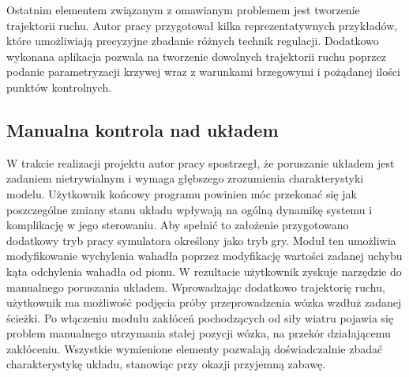 \documentclass[12pt, oneside]{report}
\theoremstyle{definition}
\begin{document}
Ostatnim elementem związanym z omawianym problemem jest tworzenie trajektorii ruchu. Autor pracy przygotował kilka reprezentatywnych przykładów, które umożliwiają precyzyjne zbadanie różnych technik regulacji. Dodatkowo wykonana aplikacja pozwala na tworzenie dowolnych trajektorii ruchu poprzez podanie parametryzacji krzywej wraz z warunkami brzegowymi i pożądanej ilości punktów kontrolnych.

\subsection{Manualna kontrola nad układem}
W trakcie realizacji projektu autor pracy spostrzegł, że poruszanie układem jest zadaniem nietrywialnym i wymaga głębszego zrozumienia charakterystyki modelu. Użytkownik końcowy programu powinien móc przekonać się jak poszczególne zmiany stanu układu wpływają na ogólną dynamikę systemu i komplikację w jego sterowaniu. Aby spełnić to założenie przygotowano dodatkowy tryb pracy symulatora określony jako tryb gry. Moduł ten umożliwia modyfikowanie wychylenia wahadła poprzez modyfikację wartości zadanej uchybu kąta odchylenia wahadła od pionu. W rezultacie użytkownik zyskuje narzędzie do manualnego poruszania układem. Wprowadzając dodatkowo trajektorię ruchu, użytkownik ma możliwość podjęcia próby przeprowadzenia wózka wzdłuż zadanej ścieżki. Po włączeniu modułu zakłóceń pochodzących od siły wiatru pojawia się problem manualnego utrzymania stałej pozycji wózka, na przekór działającemu zakłóceniu. Wszystkie wymienione elementy pozwalają doświadczalnie zbadać charakterystykę układu, stanowiąc przy okazji przyjemną zabawę.
\end{document}
